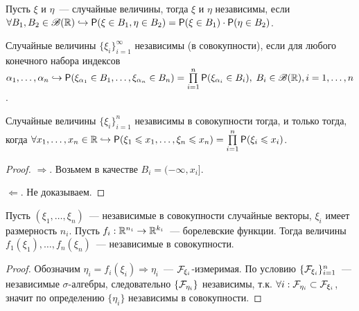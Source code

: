 \begin{definition}
	Пусть $\xi$ и $\eta$~--- случайные величины, тогда $\xi$ и $\eta$ независимы, если $\forall B_1, B_2 \in \mathscr{B}(\mathbb{R}) \hookrightarrow  \mathsf{P}(\xi \in B_1, \eta \in B_2) = \mathsf{P}(\xi \in B_1)\cdot\mathsf{P}(\eta \in B_2)$.
\end{definition}

\begin{definition}
	Случайные величины $\{\xi_i\}_{i = 1}^\infty$ независимы (в совокупности), если для любого конечного набора индексов $\alpha_1, \ldots, \alpha_n \hookrightarrow \mathsf{P}(\xi_{\alpha_1} \in B_1, \ldots, \xi_{\alpha_n} \in B_n) = \prod\limits_{i = 1}^n\mathsf{P}(\xi_{\alpha_i} \in B_i),\; B_i \in \mathscr{B}(\mathbb{R}), i = 1, \ldots, n$.
\end{definition}

\begin{theorem}
	Случайные величины $\{\xi_i\}_{i = 1}^n$ независимы в совокупности тогда, и только тогда, когда $\forall x_1, \ldots, x_n \in \mathbb{R} \hookrightarrow \mathsf{P}(\xi_1 \leqslant x_1, \ldots, \xi_n \leqslant x_n) = \prod\limits_{i = 1}^n\mathsf{P}(\xi_i \leqslant x_i)$.
	\begin{proof}
		$\Rightarrow$. Возьмем в качестве $B_i = (-\infty, x_i]$.
		
		$\Leftarrow$. Не доказываем.
	\end{proof}
\end{theorem}

\begin{theorem}
	Пусть $(\xi_1, \ldots, \xi_n)$~--- независимые в совокупности случайные векторы, $\xi_i$ имеет размерность $n_i$. Пусть $f_i: \mathbb{R}^{n_i} \rightarrow \mathbb{R}^{k_i}$~--- борелевские функции. Тогда величины $f_1(\xi_1), \ldots, f_n(\xi_n)$~--- независимые в совокупности.
	\begin{proof}
		Обозначим $\eta_i = f_i(\xi_i) \Rightarrow \eta_i$~--- $\mathcal{F}_{\xi_i}$-измеримая. По условию $\{\mathcal{F}_{\xi_i}\}_{i = 1}^n$~--- независимые $\sigma$-алгебры, следовательно $\{\mathcal{F}_{\eta_i}\}$ независимы, т.к. $\forall i : \mathcal{F}_{\eta_i} \subset \mathcal{F}_{\xi_i}$, значит по определению $\{\eta_i\}$ независимы в совокупности.
	\end{proof}
\end{theorem}